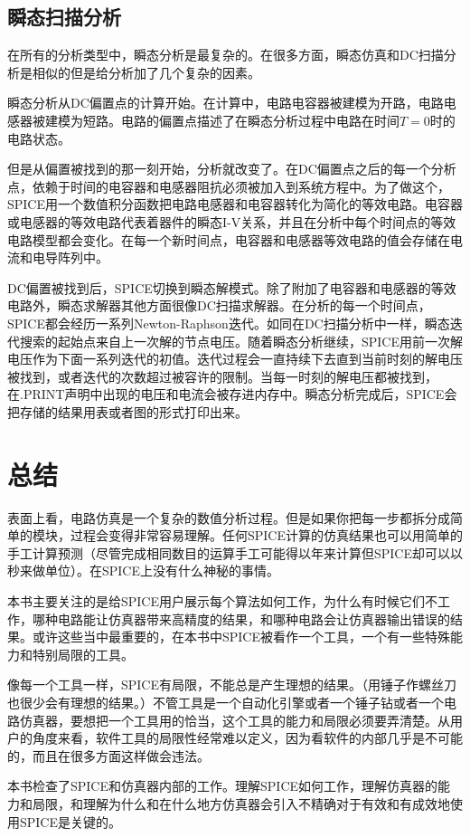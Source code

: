 \subsection{瞬态扫描分析}
在所有的分析类型中，瞬态分析是最复杂的。在很多方面，瞬态仿真和DC扫描分析是相似的但是给分析加了几个复杂的因素。

瞬态分析从DC偏置点的计算开始。在计算中，电路电容器被建模为开路，电路电感器被建模为短路。电路的偏置点描述了在瞬态分析过程中电路在时间$T=0$时的电路状态。

但是从偏置被找到的那一刻开始，分析就改变了。在DC偏置点之后的每一个分析点，依赖于时间的电容器和电感器阻抗必须被加入到系统方程中。为了做这个，SPICE用一个数值积分函数把电路电感器和电容器转化为简化的等效电路。电容器或电感器的等效电路代表着器件的瞬态I-V关系，并且在分析中每个时间点的等效电路模型都会变化。在每一个新时间点，电容器和电感器等效电路的值会存储在电流和电导阵列中。

DC偏置被找到后，SPICE切换到瞬态解模式。除了附加了电容器和电感器的等效电路外，瞬态求解器其他方面很像DC扫描求解器。在分析的每一个时间点，SPICE都会经历一系列Newton-Raphson迭代。如同在DC扫描分析中一样，瞬态迭代搜索的起始点来自上一次解的节点电压。随着瞬态分析继续，SPICE用前一次解电压作为下面一系列迭代的初值。迭代过程会一直持续下去直到当前时刻的解电压被找到，或者迭代的次数超过被容许的限制。当每一时刻的解电压都被找到，在.PRINT声明中出现的电压和电流会被存进内存中。瞬态分析完成后，SPICE会把存储的结果用表或者图的形式打印出来。

\section{总结}
表面上看，电路仿真是一个复杂的数值分析过程。但是如果你把每一步都拆分成简单的模块，过程会变得非常容易理解。任何SPICE计算的仿真结果也可以用简单的手工计算预测（尽管完成相同数目的运算手工可能得以年来计算但SPICE却可以以秒来做单位）。在SPICE上没有什么神秘的事情。

本书主要关注的是给SPICE用户展示每个算法如何工作，为什么有时候它们不工作，哪种电路能让仿真器带来高精度的结果，和哪种电路会让仿真器输出错误的结果。或许这些当中最重要的，在本书中SPICE被看作一个工具，一个有一些特殊能力和特别局限的工具。

像每一个工具一样，SPICE有局限，不能总是产生理想的结果。（用锤子作螺丝刀也很少会有理想的结果。）不管工具是一个自动化引擎或者一个锤子钻或者一个电路仿真器，要想把一个工具用的恰当，这个工具的能力和局限必须要弄清楚。从用户的角度来看，软件工具的局限性经常难以定义，因为看软件的内部几乎是不可能的，而且在很多方面这样做会违法。

本书检查了SPICE和仿真器内部的工作。理解SPICE如何工作，理解仿真器的能力和局限，和理解为什么和在什么地方仿真器会引入不精确对于有效和有成效地使用SPICE是关键的。


